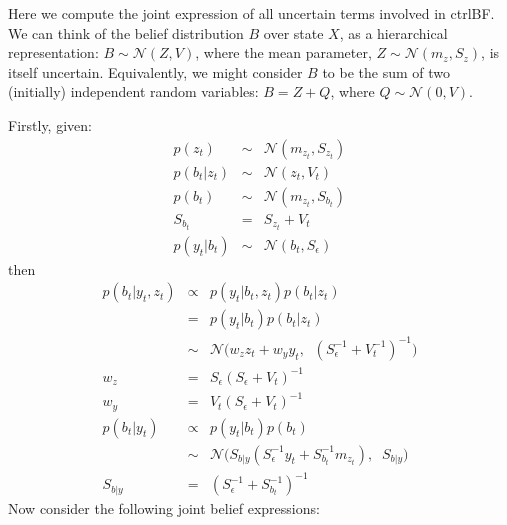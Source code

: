 \documentclass[9pt]{article}
\newcommand{\N}{\mathcal{N}}
\newcommand{\m}[1]{m_{#1}}                  %
\newcommand{\s}[1]{S_{#1}}                  %
\newcommand{\Sn}{\s{\epsilon}}              %
\newcommand{\now}[1]{#1_t}                  %
\newcommand{\pno}[1]{#1_{t}}  %
\newcommand{\inv}{^{-1}}
\newcommand{\nnn}{\nonumber \\}
\newcommand{\nn}{\nonumber}
\begin{document}
\newcommand{\CbzGy}{C_{bz|y}}
\newcommand{\vvec}[2]{\begin{bmatrix} #1 \\ #2 \end{bmatrix}} %

Here we compute the joint expression of all uncertain terms involved in ctrlBF.
We can think of the belief distribution $B$ over state $X$, as a hierarchical representation:
$B \sim \N(Z,V)$, where the mean parameter, $Z\sim\N(\m{z},\s{z})$, is itself uncertain.
Equivalently, we might consider $B$ to be the sum of two (initially) independent random variables:
$B = Z + Q$, where $Q\sim\N(0,V)$.

Firstly, given:
\begin{eqnarray}
 p(\pno{z}) &\sim& \N(\m{\pno{z}},\s{\pno{z}}) \nnn
 p(\pno{b}|\pno{z}) &\sim& \N(\pno{z},\pno{V}) \nnn
 p(\pno{b}) &\sim& \N(\m{\pno{z}},\s{\pno{b}}) \nnn
 \s{\pno{b}} &=& \s{\pno{z}}+\pno{V} \nnn
 p(\now{y}|\pno{b}) &\sim& \N(\pno{b},\Sn) \nn
\end{eqnarray}
%
then
\begin{eqnarray}
 p(\pno{b}|\now{y},\pno{z})
   &\propto& p(\now{y}|\pno{b},\pno{z})p(\pno{b}|\pno{z}) \nnn
   &=& p(\now{y}|\pno{b})p(\pno{b}|\pno{z}) \nnn
   &\sim& \N \Big(w_z \pno{z} + w_y\now{y}, \;\; (\Sn\inv+\pno{V}\inv)\inv \Big) \nnn
 w_z &=& \Sn(\Sn+\pno{V})\inv \nnn
 w_y &=& \pno{V}(\Sn+\pno{V})\inv \nnn
 p(\pno{b}|\now{y})
   &\propto& p(\now{y}|\pno{b})p(\pno{b}) \nnn
   &\sim& \N \Big( \s{b|y} (\Sn\inv \now{y} + \s{\pno{b}}\inv \m{\pno{z}}), \;\; \s{b|y} \Big) \nnn
 \s{b|y}
   &=& (\Sn\inv+\s{\pno{b}}\inv)\inv \nn
\end{eqnarray}
%
Now consider the following joint belief expressions:
\end{document}
